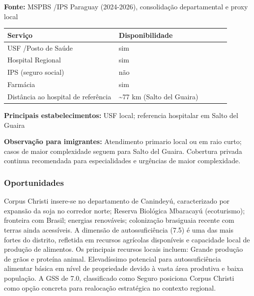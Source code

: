\textbf{Fonte:} MSPBS /\allowbreak  IPS Paraguay (2024-2026), consolidação
departamental e proxy local

{\def\LTcaptype{none} %
\begin{longtable}{@{}>{\raggedright\arraybackslash}p{0.45\linewidth} >{\raggedright\arraybackslash}p{0.45\linewidth}@{}}
\toprule\noalign{}
Serviço & Disponibilidade \\
\midrule\noalign{}
\endhead
\bottomrule\noalign{}
\endlastfoot
USF /\allowbreak  Posto de Saúde & sim \\
Hospital Regional & sim \\
IPS (seguro social) & não \\
Farmácia & sim \\
Distância ao hospital de referência & \textasciitilde77 km (Salto del
Guaira) \\
\end{longtable}
}

\textbf{Principais estabelecimentos:} USF local; referencia hospitalar
em Salto del Guaira

\textbf{Observação para imigrantes:} Atendimento primario local ou em
raio curto; casos de maior complexidade seguem para Salto del Guaira.
Cobertura privada continua recomendada para especialidades e urgências
de maior complexidade.
\newpage

\subsubsection*{Oportunidades}\label{oport-corpus-christi-1402}
Corpus Christi insere-se no departamento de Canindeyú, caracterizado por expansão da soja no corredor norte; Reserva Biológica Mbaracayú (ecoturismo); fronteira com Brasil; energias renováveis; colonização brasiguaia recente com terras ainda acessíveis. A dimensão de autossuficiência (7.5) é uma das mais fortes do distrito, refletida em recursos agrícolas disponíveis e capacidade local de produção de alimentos. Os principais recursos locais incluem: Grande produção de grãos e proteína animal. Elevadíssimo potencial para autossuficiência alimentar básica em nível de propriedade devido à vasta área produtiva e baixa população. A GSS de 7.0, classificado como Seguro posiciona Corpus Christi como opção concreta para realocação estratégica no contexto regional.

